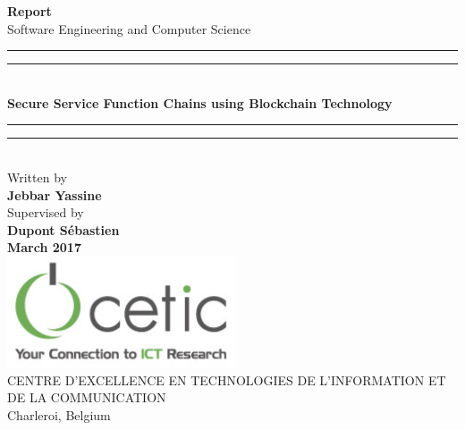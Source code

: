 \begin{titlepage}

\begin{center}
\vspace*{-1.25cm}
\textup{\small {\bf Report } \\ [0.3cm] Software Engineering and Computer Science}\\[0.4in]

\rule{\textwidth}{1.6pt}\vspace*{-\baselineskip}\vspace*{2pt} %
\rule{\textwidth}{0.4pt}\\[\baselineskip] %
\LARGE \textbf {Secure Service Function Chains using Blockchain Technology}\\[0.15cm]
\rule{\textwidth}{1.6pt}\vspace*{-\baselineskip}\vspace*{2pt} %
\rule{\textwidth}{0.4pt}\\[\baselineskip] %
       



\small Written by \\[0.15cm]
{\textbf{\small Jebbar Yassine}}\\[0.35in]  



\small Supervised by \\
{\textbf{\small Dupont Sébastien }}\\
[2cm]
\large{\textbf{March 2017}}\\
[3.0cm]

\includegraphics[scale=0.67]{cetic} \\[0.5cm]

\normalsize
\textsc{CENTRE D'EXCELLENCE EN TECHNOLOGIES DE L'INFORMATION ET DE LA COMMUNICATION}\\[0.2cm]
 Charleroi, Belgium \\
\vspace{0.35cm}


\end{center}

\end{titlepage}
